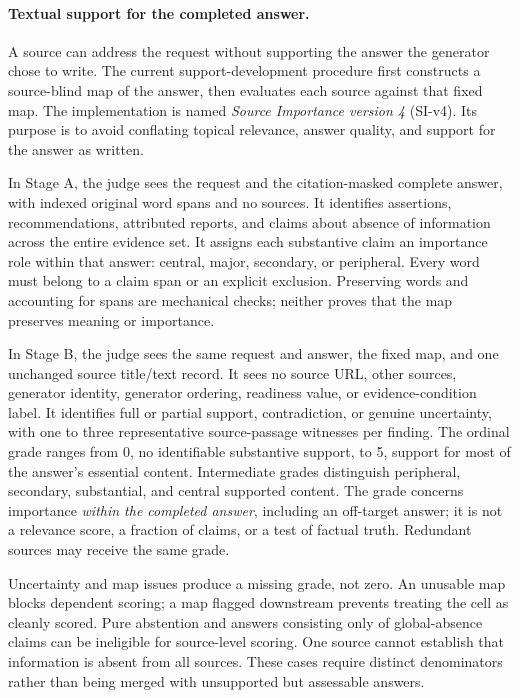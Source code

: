 \paragraph{Textual support for the completed answer.}
A source can address the request without supporting the answer the generator chose to write. The current support-development procedure first constructs a source-blind map of the answer, then evaluates each source against that fixed map. The implementation is named \emph{Source Importance version 4} (SI-v4). Its purpose is to avoid conflating topical relevance, answer quality, and support for the answer as written.

In Stage A, the judge sees the request and the citation-masked complete answer, with indexed original word spans and no sources. It identifies assertions, recommendations, attributed reports, and claims about absence of information across the entire evidence set. It assigns each substantive claim an importance role within that answer: central, major, secondary, or peripheral. Every word must belong to a claim span or an explicit exclusion. Preserving words and accounting for spans are mechanical checks; neither proves that the map preserves meaning or importance.

In Stage B, the judge sees the same request and answer, the fixed map, and one unchanged source title/text record. It sees no source URL, other sources, generator identity, generator ordering, readiness value, or evidence-condition label. It identifies full or partial support, contradiction, or genuine uncertainty, with one to three representative source-passage witnesses per finding. The ordinal grade ranges from 0, no identifiable substantive support, to 5, support for most of the answer's essential content. Intermediate grades distinguish peripheral, secondary, substantial, and central supported content. The grade concerns importance \emph{within the completed answer}, including an off-target answer; it is not a relevance score, a fraction of claims, or a test of factual truth. Redundant sources may receive the same grade.

Uncertainty and map issues produce a missing grade, not zero. An unusable map blocks dependent scoring; a map flagged downstream prevents treating the cell as cleanly scored. Pure abstention and answers consisting only of global-absence claims can be ineligible for source-level scoring. One source cannot establish that information is absent from all sources. These cases require distinct denominators rather than being merged with unsupported but assessable answers.

